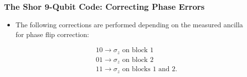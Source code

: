 \documentclass{beamer}
\begin{document}
\begin{frame}
    \frametitle{The Shor 9-Qubit Code: Correcting Phase Errors}
        \begin{itemize}
            \item The following corrections are performed depending on the measured ancilla for phase flip correction:
            
            \begin{align*}
            &10 \rightarrow \sigma_z \text{ on block 1}\\
            &01 \rightarrow \sigma_z \text{ on block 2}\\
            &11 \rightarrow \sigma_z \text{ on blocks 1 and 2}.\\
           \end{align*}
        
            
        \end{itemize}
\end{frame}
\end{document}
